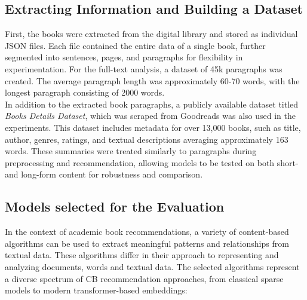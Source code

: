 \documentclass{llncs}
\begin{document}
\subsection*{Extracting Information and Building a Dataset}
First, the books were extracted from the digital library and stored as individual JSON files. Each file contained the entire data of a single book, further segmented into sentences, pages, and paragraphs for flexibility in experimentation.
For the full-text analysis, a dataset of 45k paragraphs was created. The average paragraph length was approximately 60-70 words, with the longest paragraph consisting of 2000 words.\\
In addition to the extracted book paragraphs, a publicly available dataset titled \textit{Books Details Dataset}, which was scraped from Goodreads \cite{goodreads_kumar_2022} was also used in the experiments. This dataset includes metadata for over 13,000 books, such as title, author, genres, ratings, and textual descriptions averaging approximately 163 words. These summaries were treated similarly to paragraphs during preprocessing and recommendation, allowing models to be tested on both short- and long-form content for robustness and comparison.

\subsection*{Models selected for the Evaluation}
In the context of academic book recommendations, a variety of content-based algorithms can be used to extract meaningful patterns and relationships from textual data. These algorithms differ in their approach to representing and analyzing documents, words and textual data. The selected algorithms represent a diverse spectrum of CB recommendation approaches, from classical sparse models to modern transformer-based embeddings:
\end{document}
